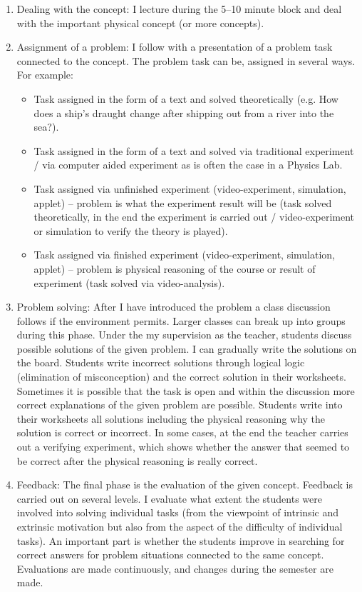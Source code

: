 \documentclass[11pt, a4paper]{awesome-cv}
\begin{document}
\begin{cvletter}
\begin{enumerate}
	\item Dealing with the concept: I lecture during the 5–10 minute block and deal with the important physical concept (or more concepts).
	
	\item Assignment of a problem: I follow with a presentation of a problem task connected to the concept. The problem task can be, assigned in several ways.  For example:
	
	\begin{itemize}
		\item Task assigned in the form of a text and solved theoretically (e.g. How does a ship’s draught change after shipping out from a river into the sea?).
		\item Task assigned in the form of a text and solved via traditional experiment / via computer aided experiment as is often the case in a Physics Lab.
		\item Task assigned via unfinished experiment (video-experiment, simulation, applet) – problem is what the experiment result will be (task solved theoretically, in the end the experiment is carried out / video-experiment or simulation to verify the theory is played).
		\item Task assigned via finished experiment (video-experiment, simulation, applet) – problem is physical reasoning of the course or result of experiment (task solved via video-analysis).
	\end{itemize}
	
	\item Problem solving: After I have introduced the problem a class discussion follows if the environment permits.  Larger classes can break up into groups during this phase. Under the my supervision as the teacher, students discuss possible solutions of the given problem. I can gradually write the solutions on the board.  Students write incorrect solutions through logical logic (elimination of misconception) and the correct solution in their worksheets.  Sometimes it is possible that the task is open and within the discussion more correct explanations of the given problem are possible.  Students write into their worksheets all solutions including the physical reasoning why the solution is correct or incorrect. In some cases, at the end the teacher carries out a verifying experiment, which shows whether the answer that seemed to be correct after the physical reasoning is really correct.
	
	\item Feedback: The final phase is the evaluation of the given concept. Feedback is carried out on several levels. I evaluate what extent the students were involved into solving individual tasks (from the viewpoint of intrinsic and extrinsic motivation but also from the aspect of the difficulty of individual tasks). An important part is whether the students improve in searching for correct answers for problem situations connected to the same concept.  Evaluations are made continuously, and changes during the semester are made. 
	
\end{enumerate}


\end{cvletter}
\end{document}
